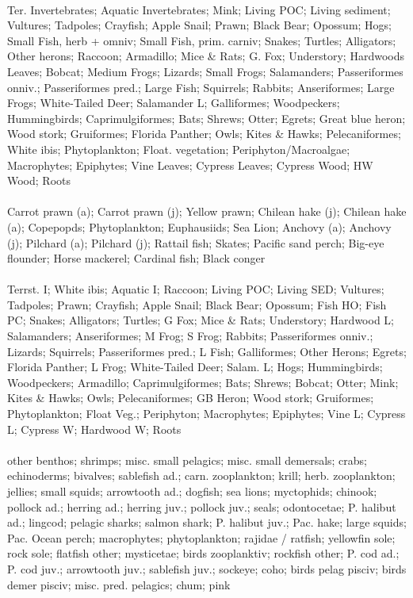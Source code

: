 \fullhline
\hline
{} \\
\hline
Ter. Invertebrates; Aquatic Invertebrates; Mink; Living POC; Living sediment; Vultures; Tadpoles; Crayfish; Apple Snail; Prawn; Black Bear; Opossum; Hogs; Small Fish, herb + omniv; Small Fish, prim. carniv; Snakes; Turtles; Alligators; Other herons; Raccoon; Armadillo; Mice \& Rats; G. Fox; Understory; Hardwoods Leaves; Bobcat; Medium Frogs; Lizards; Small Frogs; Salamanders; Passeriformes onniv.; Passeriformes pred.; Large Fish; Squirrels; Rabbits; Anseriformes; Large Frogs; White-Tailed Deer; Salamander L; Galliformes; Woodpeckers; Hummingbirds; Caprimulgiformes; Bats; Shrews; Otter; Egrets; Great blue heron; Wood stork; Gruiformes; Florida Panther; Owls; Kites \& Hawks; Pelecaniformes; White ibis; Phytoplankton; Float. vegetation; Periphyton/Macroalgae; Macrophytes; Epiphytes; Vine Leaves; Cypress Leaves; Cypress Wood; HW Wood; Roots\\
\fullhline
\hline
{} \\
\hline
Carrot prawn (a); Carrot prawn (j); Yellow prawn; Chilean hake (j); Chilean hake (a); Copepopds; Phytoplankton; Euphausiids; Sea Lion; Anchovy (a); Anchovy (j); Pilchard (a); Pilchard (j); Rattail fish; Skates; Pacific sand perch; Big-eye flounder; Horse mackerel; Cardinal fish; Black conger\\
\fullhline
\hline
{} \\
\hline
Terrst. I; White ibis; Aquatic I; Raccoon; Living POC; Living SED; Vultures; Tadpoles; Prawn; Crayfish; Apple Snail; Black Bear; Opossum; Fish HO; Fish PC; Snakes; Alligators; Turtles; G Fox; Mice \& Rats; Understory; Hardwood L; Salamanders; Anseriformes; M Frog; S Frog; Rabbits; Passeriformes onniv.; Lizards; Squirrels; Passeriformes pred.; L Fish; Galliformes; Other Herons; Egrets; Florida Panther; L Frog; White-Tailed Deer; Salam. L; Hogs; Hummingbirds; Woodpeckers; Armadillo; Caprimulgiformes; Bats; Shrews; Bobcat; Otter; Mink; Kites \& Hawks; Owls; Pelecaniformes; GB Heron; Wood stork; Gruiformes; Phytoplankton; Float Veg.; Periphyton; Macrophytes; Epiphytes; Vine L; Cypress L; Cypress W; Hardwood W; Roots\\
\fullhline
\hline
{} \\
\hline
other benthos; shrimps; misc. small pelagics; misc. small demersals; crabs; echinoderms; bivalves; sablefish ad.; carn. zooplankton; krill; herb. zooplankton; jellies; small squids; arrowtooth ad.; dogfish; sea lions; myctophids; chinook; pollock ad.; herring ad.; herring juv.; pollock juv.; seals; odontocetae; P. halibut ad.; lingcod; pelagic sharks; salmon shark; P. halibut juv.; Pac. hake; large squids; Pac. Ocean perch; macrophytes; phytoplankton; rajidae / ratfish; yellowfin sole; rock sole; flatfish other; mysticetae; birds zooplanktiv; rockfish other; P. cod ad.; P. cod juv.; arrowtooth juv.; sablefish juv.; sockeye; coho; birds pelag pisciv; birds demer pisciv; misc. pred. pelagics; chum; pink\\
